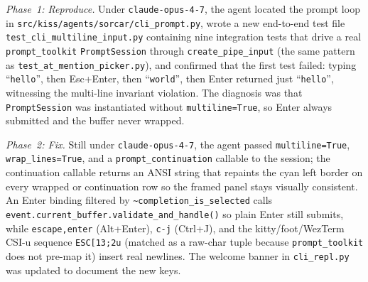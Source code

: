 \documentclass{article}
\begin{document}
\begin{sloppypar}
\emph{Phase~1: Reproduce.}
Under \texttt{claude-opus-4-7}, the agent located the prompt loop in
\texttt{src/\allowbreak kiss/\allowbreak agents/\allowbreak sorcar/\allowbreak cli\_prompt.py},
wrote a new end-to-end test file
\texttt{test\_cli\_\allowbreak multiline\_\allowbreak input.py}
containing nine integration tests that drive a real
\texttt{prompt\_toolkit} \texttt{PromptSession} through
\texttt{create\_pipe\_input} (the same pattern as
\texttt{test\_at\_\allowbreak mention\_\allowbreak picker.py}), and
confirmed that the first test failed: typing ``\texttt{hello}'', then
Esc+Enter, then ``\texttt{world}'', then Enter returned just
``\texttt{hello}'', witnessing the multi-line invariant violation.
The diagnosis was that \texttt{PromptSession} was instantiated without
\texttt{multiline=True}, so Enter always submitted and the buffer
never wrapped.
\end{sloppypar}

\begin{sloppypar}
\emph{Phase~2: Fix.}
Still under \texttt{claude-opus-4-7}, the agent passed
\texttt{multiline=True}, \texttt{wrap\_lines=True}, and a
\texttt{prompt\_continuation} callable to the session; the
continuation callable returns an ANSI string that repaints the cyan
\texttt{\textbar} left border on every wrapped or continuation row so
the framed panel stays visually consistent.  An Enter binding
filtered by \texttt{\textasciitilde completion\_is\_selected} calls
\texttt{event.\allowbreak current\_buffer.\allowbreak validate\_and\_handle()}
so plain Enter still submits, while \texttt{escape,enter} (Alt+Enter),
\texttt{c-j} (Ctrl+J), and the kitty/foot/WezTerm CSI-u sequence
\texttt{ESC[13;2u} (matched as a raw-char tuple because
\texttt{prompt\_toolkit} does not pre-map it) insert real newlines.
The welcome banner in \texttt{cli\_repl.py} was updated to document
the new keys.
\end{sloppypar}
\end{document}
